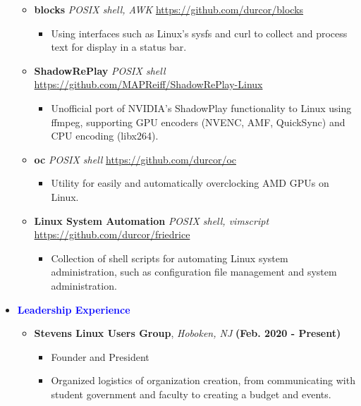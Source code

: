 \documentclass[11pt]{article}
\begin{document}
\begin{flushleft}
\begin{itemize}
\begin{itemize}
            \item \textbf{blocks} \textit{POSIX shell, AWK} \hfill{\url{https://github.com/durcor/blocks}}
                \begin{itemize}
                    \item Using interfaces such as Linux's sysfs and curl to collect and process text for display in a status bar.
                \end{itemize}
            \item \textbf{ShadowRePlay} \textit{POSIX shell} \hfill{\url{https://github.com/MAPReiff/ShadowRePlay-Linux}}
                \begin{itemize}
					\item Unofficial port of NVIDIA's ShadowPlay functionality to Linux using ffmpeg, supporting GPU encoders (NVENC, AMF, QuickSync) and CPU encoding (libx264).
                \end{itemize}
            \item \textbf{oc} \textit{POSIX shell} \hfill{\url{https://github.com/durcor/oc}}
                \begin{itemize}
                    \item Utility for easily and automatically overclocking AMD GPUs on Linux.
                \end{itemize}
            \item \textbf{Linux System Automation} \textit{POSIX shell, vimscript} \hfill{\url{https://github.com/durcor/friedrice}}
                \begin{itemize}
                    \item Collection of shell scripts for automating Linux system administration, such as configuration file management and system administration.
                \end{itemize}
        \end{itemize}
    \item[] \Large \textcolor{blue}{\textbf{Leadership Experience}} \normalsize
        \begin{itemize}
            \item \textbf{Stevens Linux Users Group}, \textit{Hoboken, NJ} \hfill{\textbf{(Feb. 2020 - Present)}}
                \begin{itemize}
                    \item Founder and President
                    \item Organized logistics of organization creation, from communicating with student government and faculty to creating a budget and events.

\end{itemize}
\end{itemize}
\end{itemize}
\end{flushleft}
\end{document}
